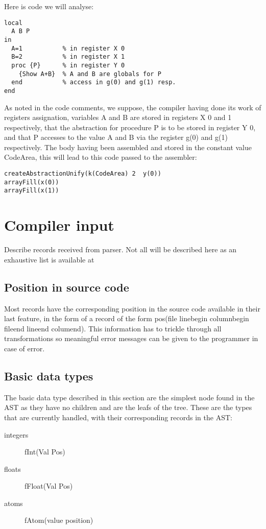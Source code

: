 \documentclass[a4paper]{memoir}
\begin{document}
Here is code we will analyse:

\begin{lstlisting}
local
  A B P
in
  A=1           % in register X 0
  B=2           % in register X 1
  proc {P}      % in register Y 0
    {Show A+B}  % A and B are globals for P
  end           % access in g(0) and g(1) resp.
end
\end{lstlisting}

As noted in the code comments, we suppose, the compiler having done its work of registers assignation, variables A and B are stored in registers X 0 and 1 respectively, that the abstraction for procedure P is to be stored in register Y 0, and that P accesses to the value A and B via the register g(0) and g(1) respectively.
The body having been assembled and stored in the constant value CodeArea, this will lead to this code passed to the assembler:
\begin{lstlisting}
createAbstractionUnify(k(CodeArea) 2  y(0))
arrayFill(x(0))
arrayFill(x(1))
\end{lstlisting}



\section{Compiler input}\label{section:compilerinput}
Describe records received from parser.
Not all will be described here as an exhaustive list is available at %
\subsection{Position in source code}
Most records have the corresponding position in the source code available in their last feature, in the form of a record of the form pos(file linebegin columnbegin fileend lineend columend). This information has to trickle through all transformations so meaningful error messages can be given to the programmer in case of error.
\subsection{Basic data types}
The basic data type described in this section are the simplest node found in the AST as they have no children and are the leafs of the tree.
These are the types that are currently handled, with their corresponding records in the AST:
\begin{description}
  \item[integers] fInt(Val Pos)
  \item[floats] fFloat(Val Pos)
  \item[atoms] fAtom(value position)
\end{description}
\end{document}
